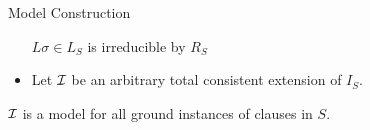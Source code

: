 \documentclass[%
handout,
]{beamer}
\begin{document}
\begin{frame}[allowframebreaks]{Model Construction}
\begin{itemize}
            \hfill
            $L\sigma\in L_S$ is irreducible by $R_S$

            \vspace{0.7em}
            \item Let $\mathcal{I}$ be an arbitrary total consistent extension of $I_S$.
        \end{itemize}

        \vspace{1.4em}

        \begin{lemma}
            $\mathcal{I}$ is a model for all ground instances of clauses in $S$.
        \end{lemma}
\end{frame}
\end{document}

